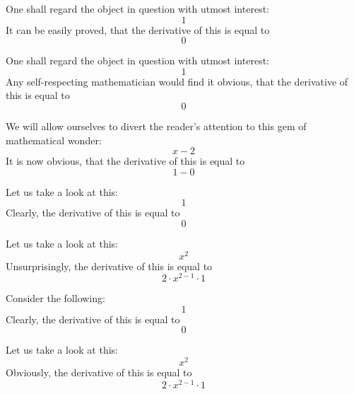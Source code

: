 \documentclass{article}
\begin{document}
One shall regard the object in question with utmost interest:
\begin{equation}
1 
\end{equation}
It can be easily proved, that the derivative of this is equal to
\begin{equation}
0 
\end{equation}

One shall regard the object in question with utmost interest:
\begin{equation}
1 
\end{equation}
Any self-respecting mathematician would find it obvious, that the derivative of this is equal to
\begin{equation}
0 
\end{equation}

We will allow ourselves to divert the reader's attention to this gem of mathematical wonder:
\begin{equation}
x - 2 
\end{equation}
It is now obvious, that the derivative of this is equal to
\begin{equation}
1 - 0 
\end{equation}

Let us take a look at this:
\begin{equation}
1 
\end{equation}
Clearly, the derivative of this is equal to
\begin{equation}
0 
\end{equation}

Let us take a look at this:
\begin{equation}
x ^{2 } 
\end{equation}
Unsurprisingly, the derivative of this is equal to
\begin{equation}
2 \cdot x ^{2 - 1 } \cdot 1 
\end{equation}

Consider the following:
\begin{equation}
1 
\end{equation}
Clearly, the derivative of this is equal to
\begin{equation}
0 
\end{equation}

Let us take a look at this:
\begin{equation}
x ^{2 } 
\end{equation}
Obviously, the derivative of this is equal to
\begin{equation}
2 \cdot x ^{2 - 1 } \cdot 1 
\end{equation}
\end{document}
